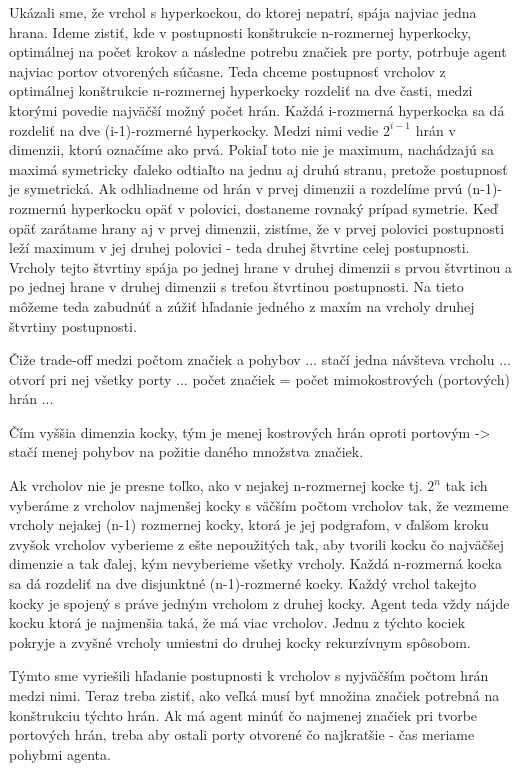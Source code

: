 Ukázali sme, že vrchol s hyperkockou, do ktorej nepatrí, spája najviac jedna
hrana. Ideme zistiť, kde v postupnosti konštrukcie n-rozmernej hyperkocky,
optimálnej na počet krokov a následne potrebu značiek pre porty, potrbuje
agent najviac portov otvorených súčasne. Teda chceme postupnosť vrcholov z
 optimálnej konštrukcie n-rozmernej hyperkocky rozdeliť na dve časti, medzi
ktorými povedie najväčší možný počet hrán. Každá i-rozmerná hyperkocka sa dá
rozdeliť na dve (i-1)-rozmerné hyperkocky. Medzi nimi vedie $2^{i-1}$
hrán v dimenzii, ktorú označíme ako prvá. Pokiaľ toto nie je maximum, 
nachádzajú sa maximá symetricky ďaleko odtiaľto na jednu aj druhú stranu,
pretože postupnosť je symetrická. Ak odhliadneme od hrán v prvej dimenzii a
rozdelíme prvú (n-1)-rozmernú hyperkocku opäť v polovici, dostaneme rovnaký
prípad symetrie. Keď opäť zarátame hrany aj v prvej dimenzii, zistíme, že v
prvej polovici postupnosti leží maximum v jej druhej polovici - teda druhej
štvrtine celej postupnosti. Vrcholy tejto štvrtiny spája po jednej hrane v
druhej dimenzii s prvou štvrtinou a po jednej hrane v druhej dimenzii s
treťou štvrtinou postupnosti. Na tieto môžeme teda zabudnúť a zúžiť hľadanie
jedného z maxím na vrcholy druhej štvrtiny postupnosti.

\iffalse
Čiže trade-off medzi počtom značiek a pohybov ... stačí jedna návšteva
vrcholu ... otvorí pri nej všetky porty ... počet značiek = počet 
mimokostrových
(portových) hrán ... 

Čím vyššia dimenzia kocky, tým je menej kostrových hrán oproti portovým ->
stačí menej pohybov na požitie daného množstva značiek.

Ak vrcholov nie je presne toľko, ako v nejakej n-rozmernej kocke tj. ${2}^{n}$
tak ich vyberáme z vrcholov najmenšej kocky s väčším počtom vrcholov tak, že
vezmeme vrcholy nejakej (n-1) rozmernej kocky, ktorá je jej podgrafom, v
ďalšom kroku zvyšok vrcholov vyberieme z ešte nepoužitých tak, aby tvorili kocku
čo najväčšej dimenzie a tak ďalej, kým nevyberieme všetky vrcholy. Každá
n-rozmerná kocka sa dá rozdeliť na dve disjunktné (n-1)-rozmerné kocky.
Každý vrchol takejto kocky je spojený s práve jedným vrcholom z druhej
kocky. Agent teda vždy nájde kocku ktorá je najmenšia taká, že má viac
vrcholov. Jednu z týchto kociek pokryje a zvyšné vrcholy umiestni do druhej
kocky rekurzívnym spôsobom.

Týmto sme vyriešili hľadanie postupnosti k vrcholov s nyjväčším počtom hrán
medzi nimi. Teraz treba zistiť, ako veľká musí byť množina značiek potrebná
na konštrukciu týchto hrán.
Ak má agent minúť čo najmenej značiek pri tvorbe portových hrán, treba aby
ostali porty otvorené čo najkratšie - čas meriame pohybmi agenta.

